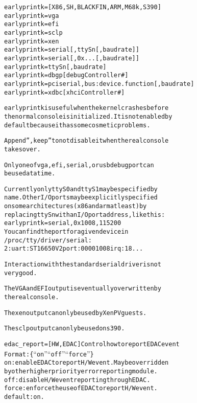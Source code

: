 \documentclass[a4paper,8pt,english]{sphinxmanual}
\begin{document}
\begin{alltt}
        earlyprintk=    {[}X86,SH,BLACKFIN,ARM,M68k,S390{]}
                        earlyprintk=vga
                        earlyprintk=efi
                        earlyprintk=sclp
                        earlyprintk=xen
                        earlyprintk=serial{[},ttySn{[},baudrate{]}{]}
                        earlyprintk=serial{[},0x...{[},baudrate{]}{]}
                        earlyprintk=ttySn{[},baudrate{]}
                        earlyprintk=dbgp{[}debugController\#{]}
                        earlyprintk=pciserial,bus:device.function{[},baudrate{]}
                        earlyprintk=xdbc{[}xhciController\#{]}

                        earlyprintk is useful when the kernel crashes before
                        the normal console is initialized. It is not enabled by
                        default because it has some cosmetic problems.

                        Append '',keep'' to not disable it when the real console
                        takes over.

                        Only one of vga, efi, serial, or usb debug port can
                        be used at a time.

                        Currently only ttyS0 and ttyS1 may be specified by
                        name.  Other I/O ports may be explicitly specified
                        on some architectures (x86 and arm at least) by
                        replacing ttySn with an I/O port address, like this:
                                earlyprintk=serial,0x1008,115200
                        You can find the port for a given device in
                        /proc/tty/driver/serial:
                                2: uart:ST16650V2 port:00001008 irq:18 ...

                        Interaction with the standard serial driver is not
                        very good.

                        The VGA and EFI output is eventually overwritten by
                        the real console.

                        The xen output can only be used by Xen PV guests.

                        The sclp output can only be used on s390.

        edac\_report=    {[}HW,EDAC{]} Control how to report EDAC event
                        Format: \{``on'' \textbar{} ``off'' \textbar{} ``force''\}
                        on: enable EDAC to report H/W event. May be overridden
                        by other higher priority error reporting module.
                        off: disable H/W event reporting through EDAC.
                        force: enforce the use of EDAC to report H/W event.
                        default: on.


\end{alltt}
\end{document}
